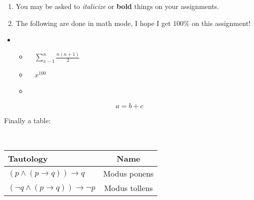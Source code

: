 \documentclass[12pt, letterpaper]{article}
\begin{document}
	
	\begin{enumerate}
		\item You may be asked to  \textit{italicize} or  \textbf{bold} things on your assignments.
		\item The following are done in math mode, I hope I get 100\% on this assignment!
	\end{enumerate}

	\renewcommand{\labelitemi}{$\phantom{}$}
	\renewcommand{\labelitemii}{$\bullet$}
	\begin{itemize}
		\item
		\begin{itemize}
			\item \ \ $\sum\limits_{x-1}^{n} \frac{n(n+1)}{2}$
			\item \ \ $x^{100}$
			\item
		\end{itemize}
	\end{itemize}
	
	$$a=b+c$$
	
	Finally a table:	
	
	\begin{table}[h!]{ \ \ \ }
		\begin{tabular}{|l|c|}
			\hline
			\textbf{Tautology} & \textbf{Name} \\ \hline
            $(p \wedge (p \rightarrow q)) \rightarrow q$ & Modus ponens \\ \hline
            $(\neg q \wedge (p \rightarrow q)) \rightarrow \neg p$ & Modus tollens \\ \hline
		\end{tabular}
	\end{table}
	
\end{document}
